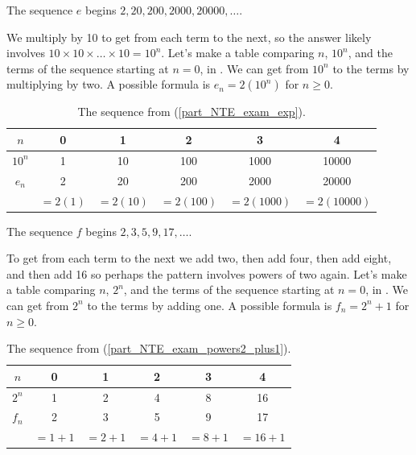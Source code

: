 \begin{exam}
\begin{apart}
            \item \label{part_NTE_exam_exp} The sequence $e$ begins $2,20,200,2000,20000, \ldots$.  
                \begin{soln}
                    We multiply by 10 to get from each term to the next, so the answer likely involves $10 \times 10 \times \ldots \times 10 = 10^n$. Let's make a table comparing $n$, $10^n$, and the terms of the sequence starting at $n=0$, in . We can get from $10^n$ to the terms by multiplying by two. A possible formula is $e_n = 2(10^n)$ for $n \ge 0$. 
                \end{soln}
                \begin{table}[hbtp]
                    \centering
                    \begin{tabular}{c|c|c |c|c|c }
                        $n$ & 0 & 1 & 2 & 3 & 4   \\ \hline
                        $10^n$ & 1 & 10 & 100 & 1000 & 10000 \\ \hline
                        $e_n$ & 2 & 20 & 200 & 2000 & 20000\\
                         & $= 2(1)$ & $= 2(10)$ & $= 2(100)$ & $= 2(1000)$ & $= 2(10000)$
                    \end{tabular}
                    \caption{The sequence from  (\ref{part_NTE_exam_exp}).}
                    \label{tab_NTE_exam_exp}
                \end{table}

            \item \label{part_NTE_exam_powers2_plus1} The sequence $f$ begins $2, 3, 5, 9, 17, \ldots$.      
                \begin{soln}
                    To get from each term to the next we add two, then add four, then add eight, and then add 16 so perhaps the pattern involves powers of two again.  Let's make a table comparing $n$, $2^n$, and the terms of the sequence starting at $n=0$, in . We can get from $2^n$ to the terms by adding one. A possible formula is $f_n = 2^n+1$ for $n \ge 0$.
                \end{soln}
                 \begin{table}[hbtp]
                    \centering
                    \begin{tabular}{c|c|c| c|c|c}
                        $n$ & 0 & 1 & 2 & 3 & 4   \\ \hline
                        $2^n$ & 1 & 2 & 4 & 8 & 16\\ \hline
                        $f_n$ & 2 &  3 &  5 &  9 &  17\\
                        & $=1+1$  & $=2+1$ & $=4+1$ & $=8+1$ & $=16+1$
                    \end{tabular}
                    \caption{The sequence from  (\ref{part_NTE_exam_powers2_plus1}).}
                    \label{tab_NTE_exam_powers2_plus1}
                \end{table}


\end{apart}
\end{exam}
